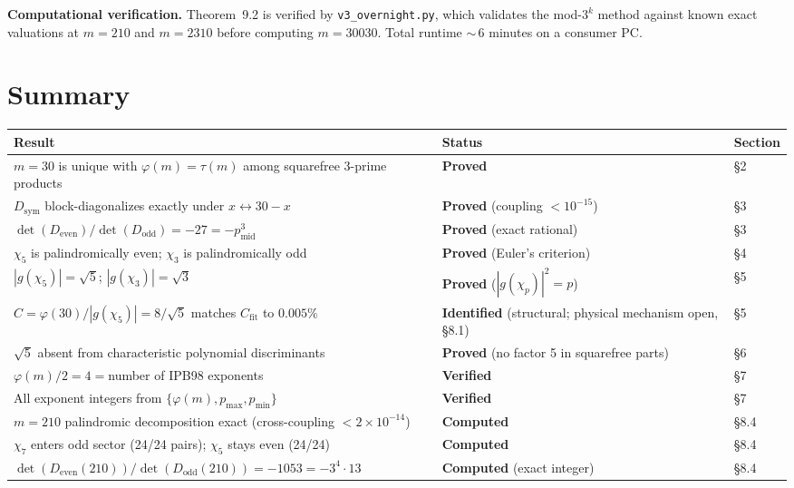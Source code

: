 \documentclass[11pt,letterpaper]{article}
\theoremstyle{definition}
\begin{document}
\medskip
\textbf{Computational verification.} Theorem~9.2 is verified by \texttt{v3\_overnight.py}, which validates the mod-$3^k$ method against known exact valuations at $m = 210$ and $m = 2310$ before computing $m = 30030$. Total runtime ${\sim}\,6$ minutes on a consumer PC.


\section{Summary}

\begin{longtable}{@{}p{}p{}l@{}}
\toprule
Result & Status & Section \\
\midrule
\endhead
$m = 30$ is unique with $\varphi(m) = \tau(m)$ among squarefree 3-prime products & \textbf{Proved} & \S2 \\
$D_{\text{sym}}$ block-diagonalizes exactly under $x \leftrightarrow 30-x$ & \textbf{Proved} (coupling $< 10^{-15}$) & \S3 \\
$\det(D_{\text{even}})/\det(D_{\text{odd}}) = -27 = -p_{\text{mid}}^3$ & \textbf{Proved} (exact rational) & \S3 \\
$\chi_5$ is palindromically even; $\chi_3$ is palindromically odd & \textbf{Proved} (Euler's criterion) & \S4 \\
$|g(\chi_5)| = \sqrt{5}$;\; $|g(\chi_3)| = \sqrt{3}$ & \textbf{Proved} ($|g(\chi_p)|^2 = p$) & \S5 \\
$C = \varphi(30)/|g(\chi_5)| = 8/\sqrt{5}$ matches $C_{\text{fit}}$ to $0.005\%$ & \textbf{Identified} (structural; physical mechanism open, \S8.1) & \S5 \\
$\sqrt{5}$ absent from characteristic polynomial discriminants & \textbf{Proved} (no factor 5 in squarefree parts) & \S6 \\
$\varphi(m)/2 = 4 = {}$number of IPB98 exponents & \textbf{Verified} & \S7 \\
All exponent integers from $\{\varphi(m), p_{\text{max}}, p_{\text{min}}\}$ & \textbf{Verified} & \S7 \\
$m = 210$ palindromic decomposition exact (cross-coupling $< 2 \times 10^{-14}$) & \textbf{Computed} & \S8.4 \\
$\chi_7$ enters odd sector (24/24 pairs); $\chi_5$ stays even (24/24) & \textbf{Computed} & \S8.4 \\
$\det(D_{\text{even}}(210))/\det(D_{\text{odd}}(210)) = -1053 = -3^4 \cdot 13$ & \textbf{Computed} (exact integer) & \S8.4 \\

\end{longtable}
\end{document}
